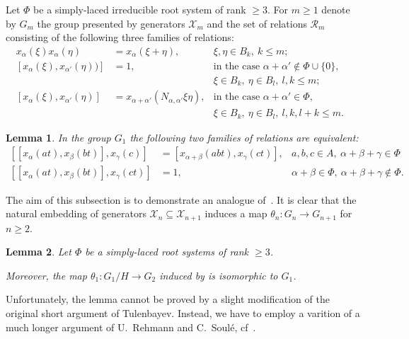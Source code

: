 \documentclass[oneside, 10pt]{amsart}
\newcommand{\RR}[1]{\mathcal{R}_{#1}}
\numberwithin{equation}{section}
\newtheorem{lemma}{Lemma}
\numberwithin{lemma}{section}
\theoremstyle{definition}
\theoremstyle{remark}
\begin{document}
Let $\Phi$ be a simply-laced irreducible root system of rank $\geq 3$.
For $m\geq 1$ denote by $G_m$ the group presented by generators $\mathcal{X}_m$ and the set of relations $\RR{m}$ consisting of the following
 three families of relations:
\begin{align}
 \label{eq:am} \tag{$a_m$} x_\alpha(\xi) x_\alpha(\eta) & = x_\alpha(\xi+\eta),&  \xi,\eta\in B_k,\ k\leq m;&\\
 \label{eq:bm} \tag{$b_m$} [x_\alpha(\xi), x_{\alpha'}(\eta))] &  = 1, & \text{in the case $\alpha+\alpha'\not\in\Phi\cup\{0\}$,}\\
 \nonumber                                                     &       & \xi \in B_k,\ \eta \in B_l,\ l,k\leq m;\\
 \label{eq:cm} \tag{$c_m$} [x_\alpha(\xi), x_{\alpha'}(\eta)] & = x_{\alpha+\alpha'}(N_{\alpha,\alpha'}\xi\eta), & \text{in the case $\alpha+\alpha'\in \Phi$,}\\
 \nonumber                                                    &  & \xi \in B_k,\ \eta \in B_l,\ l, k, l+k \leq m.
 \end{align}

 \begin{lemma} In the group $G_1$ the following two families of relations are equivalent:
\begin{align} \nonumber \tag{$d_1$}
[[x_{\alpha}(a t), x_{\beta}(b t)],  x_{\gamma}(c)] & = [x_{\alpha + \beta}(a b t),  x_{\gamma}(c t)], & a,b,c \in A,\ \alpha + \beta + \gamma \in \Phi\\
\nonumber \tag{$e_1$}
[[x_{\alpha}(at), x_{\beta}(bt)], x_{\gamma}(ct) ]& = 1, & \alpha + \beta \in \Phi,\ \alpha+\beta+\gamma \not\in \Phi. \end{align}
 \end{lemma}

 
The aim of this subsection is to demonstrate an analogue of~\cite[Lemma~3.3]{Tu83}. 
It is clear that the natural embedding of generators $\mathcal{X}_n \subseteq \mathcal{X}_{n+1}$ induces
 a map $\theta_n\colon G_n \to G_{n+1}$ for $n\geq 2$.
\begin{lemma}\label{lem:tul3.3}
 Let $\Phi$ be a simply-laced root systems of rank $\geq 3$. 
 
 Moreover, the map $\theta_1\colon G_1/H \to G_2$ induced by  is isomorphic to $G_1$.
\end{lemma}
Unfortunately, the lemma cannot be proved by a slight modification of the original short argument of Tulenbayev.
Instead, we have to employ a varition of a much longer argument of U.~Rehmann and C.~Soul{\'e}, cf~\cite{Re75,RS76}.
\end{document}

